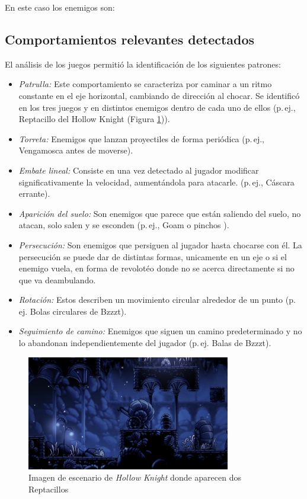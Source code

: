 En este caso los enemigos son:

\subsection{Comportamientos relevantes detectados}
El análisis de los juegos permitió la identificación de los siguientes patrones:  
\begin{itemize}
  \item \emph{Patrulla:} Este comportamiento se caracteriza por caminar a un ritmo constante en el eje horizontal, cambiando de dirección al chocar. Se identificó en los tres juegos y en distintos enemigos dentro de cada uno de ellos (p.\,ej., Reptacillo del Hollow Knight (Figura \ref{fig:Reptacillo})).  
  \item \emph{Torreta:} Enemigos que lanzan proyectiles de forma periódica  (p.\,ej., Vengamosca antes de moverse).  
  \item \emph{Embate lineal:} Consiste en una vez detectado al jugador modificar significativamente la velocidad, aumentándola para atacarle. (p.\,ej., Cáscara errante).  
  \item \emph{Aparición del suelo:} Son enemigos que parece que están saliendo del suelo, no atacan, solo salen y se esconden (p.\,ej., Goam o pinchos ).  
  \item \emph{Persecución:} Son enemigos que persiguen al jugador hasta chocarse con él. La persecución se puede dar de distintas formas, unicamente en un eje o si el enemigo vuela, en forma de revolotéo donde no se acerca directamente si no que va deambulando.
  \item \emph{Rotación:} Estos describen un movimiento circular alrededor de un punto (p.\,ej. Bolas circulares de Bzzzt).
  \item \emph{Seguimiento de camino:} Enemigos que siguen un camino predeterminado y no lo abandonan independientemente del jugador (p.\,ej. Balas de Bzzzt).
\end{itemize}

\begin{figure}[t]
	\centering
	\includegraphics[height=5cm]{Imagenes/Reptacillo_Image.png}
	\caption{Imagen de escenario de \textit{Hollow Knight} donde aparecen dos Reptacillos}
	\label{fig:Reptacillo}
\end{figure}

